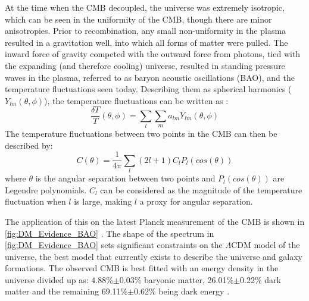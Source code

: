\par
At the time when the CMB decoupled, the universe was extremely isotropic, which can be seen in the uniformity of the CMB, though there are minor anisotropies.
Prior to recombination, any small non-uniformity in the plasma resulted in a gravitation well, into which all forms of matter were pulled.
The inward force of gravity competed with the outward force from photons, tied with the expanding (and therefore cooling) universe, resulted in standing pressure waves in the plasma, referred to as baryon acoustic oscillations (BAO), and the temperature fluctuations seen today.
Describing them as spherical harmonics ($Y_{lm}(\theta,\phi)$), the temperature fluctuations can be written as \cite{History_Of_Dark_Matter_2018_ref}:
\begin{equation}
    \frac{\delta T}{T}(\theta, \phi) = \sum_{l} \sum_{m} a_{lm}Y_{lm}(\theta,\phi)
    \label{eq:bao_spherical_harmonics}
\end{equation}
The temperature fluctuations between two points in the CMB can then be described by:
\begin{equation}
    C(\theta) = \frac{1}{4\pi} \sum_{l} (2l + 1) C_l P_l (cos(\theta))
\end{equation}
where $\theta$ is the angular separation between two points and $P_l (cos(\theta))$ are Legendre polynomials.
$C_l$ can be considered as the magnitude of the temperature fluctuation when $l$ is large, making $l$ a proxy for angular separation.
\par
The application of this on the latest Planck measurement of the CMB is shown in \autoref{fig:DM_Evidence_BAO} \cite{plank_result_ref}.
The shape of the spectrum in \autoref{fig:DM_Evidence_BAO} sets significant constraints on the $\Lambda$CDM model of the universe, the best model that currently exists to describe the universe and galaxy formations.
The observed CMB is best fitted with an energy density in the universe divided up as: 4.88\%$\pm$0.03\% baryonic matter, 26.01\%$\pm$0.22\% dark matter and the remaining 69.11\%$\pm$0.62\% being dark energy \cite{plank_result_ref}.

